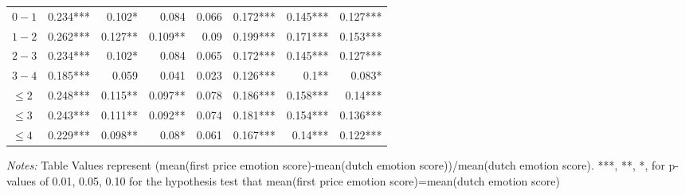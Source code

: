 \documentclass[]{article}
\begin{document}
\begin{table}[!htb]
\begin{tabular}{lrrrrrrr}
\cmidrule(lr){1-1} \cmidrule(lr){2-8}
$0-1$ & 0.234***  & 0.102*    & 0.084     & 0.066     & 0.172***  & 0.145***  & 0.127***  \\ 
  $1-2$ & 0.262***  & 0.127**   & 0.109**   & 0.09      & 0.199***  & 0.171***  & 0.153***  \\ 
  $2-3$ & 0.234***  & 0.102*    & 0.084     & 0.065     & 0.172***  & 0.145***  & 0.127***  \\ 
  $3-4$ & 0.185***  & 0.059     & 0.041     & 0.023     & 0.126***  & 0.1**     & 0.083*    \\ 
$\leq 2$ & 0.248***  & 0.115**   & 0.097**   & 0.078     & 0.186***  & 0.158***  & 0.14***   \\ 
$\leq 3$ & 0.243***  & 0.111**   & 0.092**   & 0.074     & 0.181***  & 0.154***  & 0.136***  \\ 
$\leq 4$ & 0.229***  & 0.098**   & 0.08*     & 0.061     & 0.167***  & 0.14***   & 0.122***  \\ 
\bottomrule 

\end{tabular} 

\begin{minipage}{\textwidth}
\footnotesize
\vspace{0.25cm}
\emph{Notes:} Table Values represent (mean(first price emotion score)-mean(dutch emotion score))/mean(dutch emotion score). ***, **, *, for p-values of 0.01, 0.05, 0.10 for the hypothesis test that mean(first price emotion score)=mean(dutch emotion score)
\end{minipage}
\endgroup
\end{table}
\end{document}
